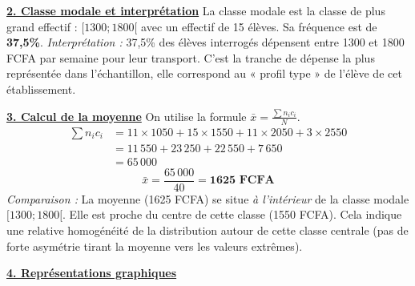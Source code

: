 \documentclass[11pt]{article}
\begin{document}
\begin{exoresolu}
\underline{\textbf{2. Classe modale et interprétation}}
La classe modale est la classe de plus grand effectif : \textbf{$[1300 ; 1800[$} avec un effectif de 15 élèves.
Sa fréquence est de \textbf{37,5\%}.
\textit{Interprétation :} 37,5\% des élèves interrogés dépensent entre 1300 et 1800 FCFA par semaine pour leur transport. C'est la tranche de dépense la plus représentée dans l'échantillon, elle correspond au « profil type » de l'élève de cet établissement.

\underline{\textbf{3. Calcul de la moyenne}}
On utilise la formule $\bar{x} = \frac{\sum n_i c_i}{N}$.
\begin{align*}
\sum n_i c_i &= 11 \times 1050 + 15 \times 1550 + 11 \times 2050 + 3 \times 2550 \\
&= 11\,550 + 23\,250 + 22\,550 + 7\,650 \\
&= 65\,000
\end{align*}
\[
\bar{x} = \frac{65\,000}{40} = \textbf{1625 FCFA}
\]
\textit{Comparaison :} La moyenne (1625 FCFA) se situe \emph{à l'intérieur} de la classe modale $[1300 ; 1800[$. Elle est proche du centre de cette classe (1550 FCFA). Cela indique une relative homogénéité de la distribution autour de cette classe centrale (pas de forte asymétrie tirant la moyenne vers les valeurs extrêmes).

\underline{\textbf{4. Représentations graphiques}}


\end{exoresolu}
\end{document}
